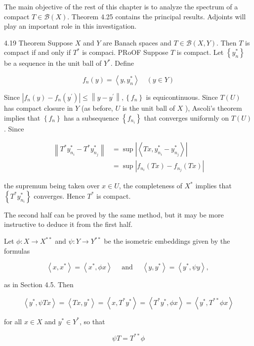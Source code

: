\documentclass[10pt]{article}
\begin{document}
The main objective of the rest of this chapter is to analyze the spectrum of a compact $T \in \mathscr{B}(X)$. Theorem 4.25 contains the principal results. Adjoints will play an important role in this investigation.

4.19 Theorem Suppose $X$ and $Y$ are Banach spaces and $T \in \mathscr{B}(X, Y)$. Then $T$ is compact if and only if $T^{*}$ is compaci. PRoOF Suppose $T$ is compact. Let $\left\{y_{n}^{*}\right\}$ be a sequence in the unit ball of $Y^{*}$.
Define

$$
f_{n}(y)=\left\langle y, y_{n}^{*}\right\rangle \quad(y \in Y)
$$

Since $\left|f_{n}(y)-f_{n}\left(y^{\prime}\right)\right| \leq\left\|y-y^{\prime}\right\|,\left\{f_{n}\right\}$ is equicontinuous. Since $T(U)$ has compact closure in $Y$ (as before, $U$ is the unit ball of $X$ ), Ascoli's theorem implies that $\left\{f_{n}\right\}$ has a subsequence $\left\{f_{n_{i}}\right\}$ that converges uniformly on $T(U)$. Since

$$
\begin{aligned}
\left\|T^{*} y_{n_{i}}^{*}-T^{*} y_{n_{j}}^{*}\right\| & =\sup \left|\left\langle T x, y_{n_{i}}^{*}-y_{n_{j}}^{*}\right\rangle\right| \\
& =\sup \left|f_{n_{i}}(T x)-f_{n_{j}}(T x)\right|
\end{aligned}
$$

the supremum being taken over $x \in U$, the completeness of $X^{*}$ implies that $\left\{T^{*} y_{n_{i}}^{*}\right\}$ converges. Hence $T^{*}$ is compact.

The second half can be proved by the same method, but it may be more instructive to deduce it from the first half.

Let $\phi: X \rightarrow X^{* *}$ and $\psi: Y \rightarrow Y^{* *}$ be the isometric embeddings given by the formulas

$$
\left\langle x, x^{*}\right\rangle=\left\langle x^{*}, \phi x\right\rangle \quad \text { and } \quad\left\langle y, y^{*}\right\rangle=\left\langle y^{*}, \psi y\right\rangle \text {, }
$$

as in Section 4.5. Then

$$
\left\langle y^{*}, \psi T x\right\rangle=\left\langle T x, y^{*}\right\rangle=\left\langle x, T^{*} y^{*}\right\rangle=\left\langle T^{*} y^{*}, \phi x\right\rangle=\left\langle y^{*}, T^{* *} \phi x\right\rangle
$$

for all $x \in X$ and $y^{*} \in Y^{*}$, so that

$$
\psi T=T^{* *} \phi
$$
\end{document}
